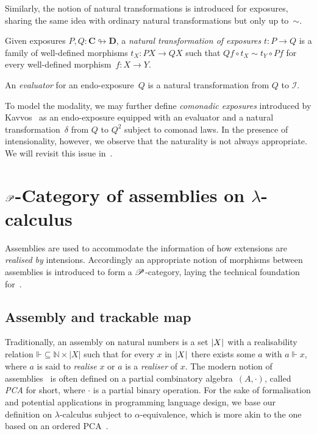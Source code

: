 \documentclass[a4paper,UKenglish,numberwithinsect,cleveref,thm-restate,draft]{lipics-v2021}
\numberwithin{equation}{section}
\theoremstyle{definition}
\theoremstyle{plain}
\begin{document}
Similarly, the notion of natural transformations is introduced for exposures, sharing the same idea with ordinary natural transformations but only up to~$\sim$.
\begin{definition}
  Given exposures $P, Q\colon \mathbf{C} \looparrowright \mathbf{D}$, a \emph{natural transformation of exposures} $t\colon P \to Q$ is a family of well-defined morphisms $t_X \colon PX \to QX$ such that $Qf \circ t_X \sim t_Y \circ Pf$ for every well-defined morphism~$f\colon X \to Y$. 
\end{definition}
An \emph{evaluator} for an endo-exposure~$Q$ is a natural transformation from $Q$ to $\mathcal{I}$.

To model the \SFour modality, we may further define \emph{comonadic exposures} introduced by Kavvos~\cite{Kavvos2017b} as an endo-exposure equipped with an evaluator and a natural transformation~$\delta$ from $Q$ to $Q^2$ subject to comonad laws.
In the presence of intensionality, however, we observe that the naturality is not always appropriate.
We will revisit this issue in~.

\section{\texorpdfstring{$\mathscr{P}$}{P}-Category of assemblies on \texorpdfstring{$\lambda$}{λ}-calculus}\label{sec:assemblies}

Assemblies are used to accommodate the information of how extensions are \emph{realised by} intensions.
Accordingly an appropriate notion of morphisms between assemblies is introduced to form a $\mathscr{P}$-category, laying
the technical foundation for~.


\subsection{Assembly and trackable map}
Traditionally, an assembly on natural numbers is a set $\mathopen{}\left|X\right|_{}^{}\mathclose{}$ with a realisability relation $\mathord{\Vdash} \subseteq \mathbb{N} \times |X|$ such that for every $x$ in $\mathopen{}\left|X\right|_{}^{}\mathclose{}$ there exists some $a$ with $a \Vdash x$, where $a$ is said to \emph{realise} $x$ or $a$ is a \emph{realiser} of $x$.
The modern notion of assemblies~\cite{Oosten2008} is often defined on a partial  combinatory algebra~$(A, \cdot)$, called \emph{PCA} for short, where $\cdot$ is a partial binary operation.
For the sake of formalisation and potential applications in programming language design, we base our definition on $\lambda$-calculus subject to $\alpha$-equivalence, which is more akin to the one based on an ordered PCA~\cite{Hofstra2003}. 
\end{document}
